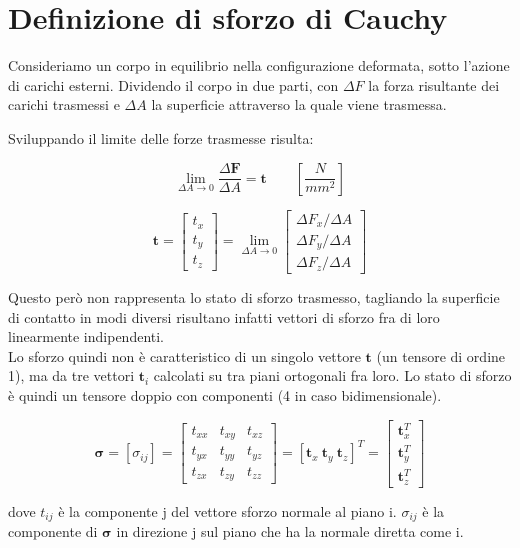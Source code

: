 \section{Definizione di sforzo di Cauchy}

Consideriamo un corpo in equilibrio nella configurazione deformata, sotto l'azione di carichi esterni. Dividendo il corpo in due parti, con $\Delta F$ la forza risultante dei carichi trasmessi e $\Delta A $ la superficie attraverso la quale viene trasmessa. 

Sviluppando il limite delle forze trasmesse risulta:

\begin{equation*}
 \lim_{\Delta A \to 0} \frac{\Delta \mathbf{F}}{\Delta A}   =\mathbf{t}             \quad\quad \left[ \frac{N}{mm^2} \right]
\end{equation*}

\begin{equation*}
\mathbf{t} = 
\begin{bmatrix}
t_x \\
t_y \\
t_z
\end{bmatrix}
=
\lim_{\Delta A \to 0} 
\begin{bmatrix}
\Delta F_x / \Delta A \\
\Delta F_y / \Delta A \\
\Delta F_z / \Delta A
\end{bmatrix}
\end{equation*}

Questo però non rappresenta lo stato di sforzo trasmesso, tagliando la superficie di contatto in modi diversi risultano infatti vettori di sforzo fra di loro linearmente indipendenti.\\
Lo sforzo quindi non è caratteristico di un singolo vettore $\mathbf{t}$ (un tensore di ordine 1),  ma da tre vettori $\mathbf{t}_i$ calcolati su tra piani ortogonali fra loro. Lo stato di sforzo è quindi un tensore doppio con componenti (4 in caso bidimensionale).

\begin{equation*}
\boldsymbol{\sigma} 
= \left[ \sigma_{ij} \right] 
= \begin{bmatrix}
t_{xx} & t_{xy} & t_{xz} \\
t_{yx} & t_{yy} & t_{yz} \\
t_{zx} & t_{zy} & t_{zz}
\end{bmatrix}
= \left[ 
\mathbf{t}_x \ \mathbf{t}_y \ \mathbf{t}_z
\right]^T
=\begin{bmatrix}
\mathbf{t}_x^T \\
\mathbf{t}_y^T \\
\mathbf{t}_z^T
\end{bmatrix}
\end{equation*}

dove $t_{ij}$ è la componente j del vettore sforzo normale al piano i.
$\sigma_{ij}$ è la componente di $\boldsymbol{\sigma}$ in direzione j sul piano che ha la normale diretta come i.




